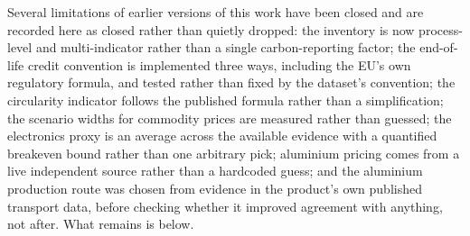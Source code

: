 \documentclass[11pt,a4paper]{article}
\begin{document}
Several limitations of earlier versions of this work have been closed and are
recorded here as closed rather than quietly dropped: the inventory is now
process-level and multi-indicator rather than a single carbon-reporting factor;
the end-of-life credit convention is implemented three ways, including the
EU's own regulatory formula, and tested rather than fixed by the dataset's
convention; the circularity indicator follows the published formula rather
than a simplification; the scenario widths for commodity prices are measured
rather than guessed; the electronics proxy is an average across the available
evidence with a quantified breakeven bound rather than one arbitrary pick;
aluminium pricing comes from a live independent source rather than a
hardcoded guess; and the aluminium production route was chosen from evidence
in the product's own published transport data, before checking whether it
improved agreement with anything, not after. What remains is below.
\end{document}
